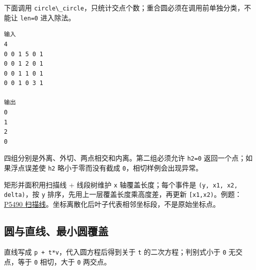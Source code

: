 下面调用 \passthrough{\lstinline!circle\_circle!}，只统计交点个数；重合圆必须在调用前单独分类，不能让 \passthrough{\lstinline!len=0!} 进入除法。

\begin{lstlisting}
输入
4
0 0 1 5 0 1
0 0 1 2 0 1
0 0 1 1 0 1
0 0 1 0 3 1

输出
0
1
2
0
\end{lstlisting}

四组分别是外离、外切、两点相交和内离。第二组必须允许 \passthrough{\lstinline!h2=0!} 返回一个点；如果浮点误差使 \passthrough{\lstinline!h2!} 略小于零而没有截成 \passthrough{\lstinline!0!}，相切样例会出现异常。

矩形并面积用扫描线 + 线段树维护 \passthrough{\lstinline!x!} 轴覆盖长度；每个事件是 \passthrough{\lstinline!(y, x1, x2, delta)!}，按 \passthrough{\lstinline!y!} 排序，先用上一层覆盖长度乘高度差，再更新 \passthrough{\lstinline![x1,x2)!}。例题：\href{https://www.luogu.com.cn/problem/P5490}{P5490 扫描线}。坐标离散化后叶子代表相邻坐标段，不是原始坐标点。


\subsection{圆与直线、最小圆覆盖}

直线写成 \passthrough{\lstinline!p + t*v!}，代入圆方程后得到关于 \passthrough{\lstinline!t!} 的二次方程；判别式小于 \passthrough{\lstinline!0!} 无交点，等于 \passthrough{\lstinline!0!} 相切，大于 \passthrough{\lstinline!0!} 两交点。

